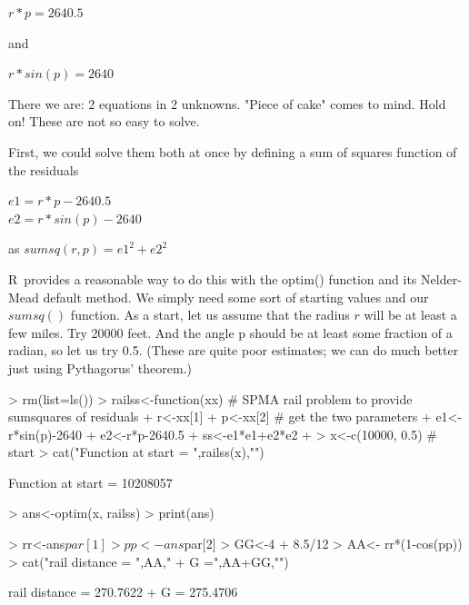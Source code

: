\documentclass[11pt,letterpaper]{article}
\newcommand{\R}{{\sf R\ }}
\begin{document}
$ r * p = 2640.5 $  

and

$ r * sin(p) = 2640 $

There we are: 2 equations in 2 unknowns. "Piece of cake" comes to mind. Hold on! These are not so easy to solve.

First, we could solve them both at once by defining a sum of squares function of the residuals

\indent
$ e1 = r * p - 2640.5 $\\
\indent
$ e2 = r * sin(p) - 2640 $

\noindent
as  $ sumsq(r, p) = e1^2 + e2^2 $

\R  provides a reasonable way to do this with the optim() function and its Nelder-Mead default method. We simply need some sort of starting values and our $sumsq()$ function. As a start, let us assume that the radius $r$ will be at least a few miles. Try 20000 feet. And the angle p should be at least some fraction of a radian, so let us try 0.5. (These are quite poor estimates; we can do much better just using Pythagorus' theorem.)

\begin{Schunk}
\begin{Sinput}
> rm(list=ls())
> railss<-function(xx){ # SPMA rail problem to provide sumsquares of residuals
+     r<-xx[1]
+     p<-xx[2] # get the two parameters
+     e1<-r*sin(p)-2640
+     e2<-r*p-2640.5
+     ss<-e1*e1+e2*e2
+ }
> x<-c(10000, 0.5) # start
> cat("Function at start = ",railss(x),"\n")
\end{Sinput}
\begin{Soutput}
Function at start =  10208057 
\end{Soutput}
\begin{Sinput}
> ans<-optim(x, railss)
> print(ans)
\end{Sinput}
\begin{Sinput}
> rr<-ans$par[1]
> pp<-ans$par[2]
> GG<-4 + 8.5/12
> AA<-  rr*(1-cos(pp)) 
> cat("rail distance = ",AA," + G =",AA+GG,"\n")
\end{Sinput}
\begin{Soutput}
rail distance =  270.7622  + G = 275.4706 
\end{Soutput}
\end{Schunk}
\end{document}
